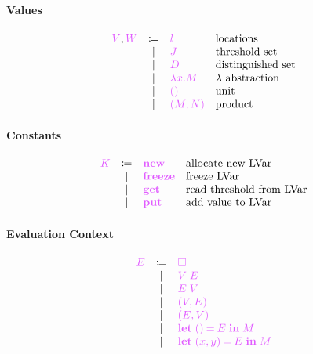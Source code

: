 \documentclass[main.tex]{subfiles}
\begin{document}
\paragraph{Values}
\[
\begin{array}{lcll}
  \tm{V}, \tm{W}
  & \coloneqq & \tm{l}                        & \text{locations} \\
  & \sep      & \tm{J}                        & \text{threshold set} \\
  & \sep      & \tm{D}                        & \text{distinguished set} \\
  & \sep      & \tm{\lambda x.M}              & \lambda \text{ abstraction} \\
  & \sep      & \tm{\unit}                    & \text{unit} \\
  & \sep      & \tm{\pair{M}{N}}              & \text{product} \\
\end{array}
\]

\paragraph{Constants}
\[
\begin{array}{lcll}
  \tm{K}
  & \coloneqq & \tm{\lvarnew}                 & \text{allocate new LVar} \\
  & \sep      & \tm{\lvarfreeze}              & \text{freeze LVar} \\
  & \sep      & \tm{\lvarget}                 & \text{read threshold from
                                                  LVar} \\
  & \sep      & \tm{\lvarput}                 & \text{add value to LVar} \\
\end{array}
\]

\paragraph{Evaluation Context}
\[
\begin{array}{lcll}
  \tm{E}
  & \coloneqq & \tm{\hole}                 \\
  & \sep      & \tm{V\; E}                 \\       
  & \sep      & \tm{E\; V}                 \\     
  & \sep      & \tm{(V, E)}                \\   
  & \sep      & \tm{(E, V)}                \\   
  & \sep      & \tm{\letunit{E}{M}}        \\                                                   
  & \sep      & \tm{\letpair{x}{y}{E}{M}}  \\   
\end{array}
\]
\end{document}
